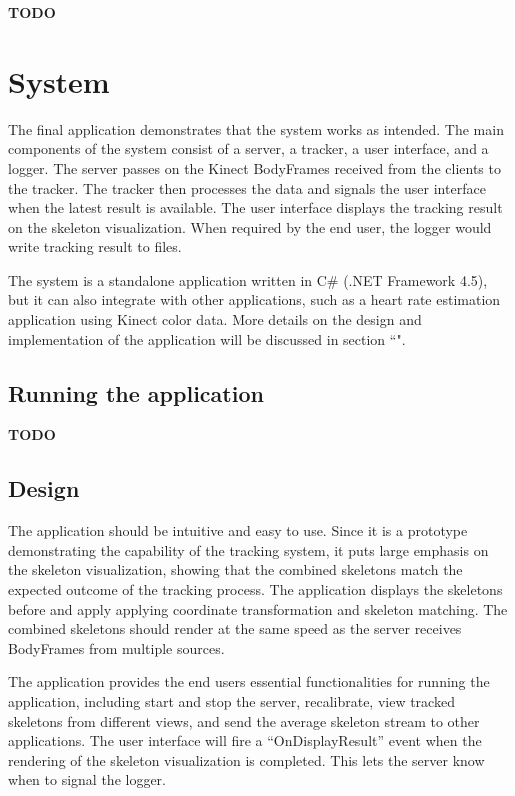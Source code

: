 \documentclass{sigchi}
\begin{document}
\textbf{TODO}

\section{System}
\label{sec:system}

The final application demonstrates that the system works as intended. The main components of the system consist of a server, a tracker, a user interface, and a logger. The server passes on the Kinect BodyFrames received from the clients to the tracker. The tracker then processes the data and signals the user interface when the latest result is available. The user interface displays the tracking result on the skeleton visualization. When required by the end user, the logger would write tracking result to files.

The system is a standalone application written in C\# (.NET Framework 4.5), but it can also integrate with other applications, such as a heart rate estimation application using Kinect color data. More details on the design and implementation of the application will be discussed in section ``".

\subsection{Running the application}

\textbf{TODO}

\subsection{Design}

The application should be intuitive and easy to use. Since it is a prototype demonstrating the capability of the tracking system, it puts large emphasis on the skeleton visualization, showing that the combined skeletons match the expected outcome of the tracking process. The application displays the skeletons before and apply applying coordinate transformation and skeleton matching. The combined skeletons should render at the same speed as the server receives BodyFrames from multiple sources. 

The application provides the end users essential functionalities for running the application, including start and stop the server, recalibrate, view tracked skeletons from different views, and send the average skeleton stream to other applications. The user interface will fire a ``OnDisplayResult'' event when the rendering of the skeleton visualization is completed. This lets the server know when to signal the logger.
\end{document}
